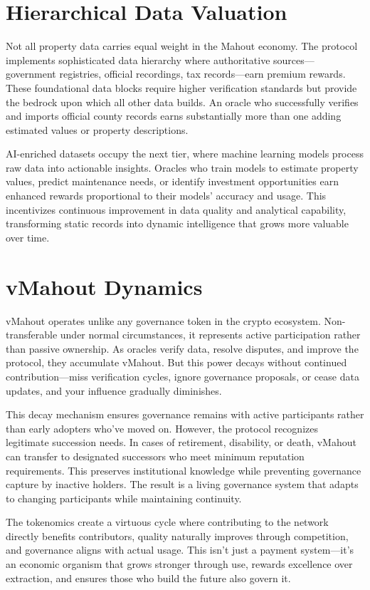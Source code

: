 \section{Hierarchical Data Valuation}

Not all property data carries equal weight in the Mahout economy. The protocol implements sophisticated data hierarchy where authoritative sources---government registries, official recordings, tax records---earn premium rewards. These foundational data blocks require higher verification standards but provide the bedrock upon which all other data builds. An oracle who successfully verifies and imports official county records earns substantially more than one adding estimated values or property descriptions.

AI-enriched datasets occupy the next tier, where machine learning models process raw data into actionable insights. Oracles who train models to estimate property values, predict maintenance needs, or identify investment opportunities earn enhanced rewards proportional to their models' accuracy and usage. This incentivizes continuous improvement in data quality and analytical capability, transforming static records into dynamic intelligence that grows more valuable over time.

\section{vMahout Dynamics}

vMahout operates unlike any governance token in the crypto ecosystem. Non-transferable under normal circumstances, it represents active participation rather than passive ownership. As oracles verify data, resolve disputes, and improve the protocol, they accumulate vMahout. But this power decays without continued contribution---miss verification cycles, ignore governance proposals, or cease data updates, and your influence gradually diminishes.

This decay mechanism ensures governance remains with active participants rather than early adopters who've moved on. However, the protocol recognizes legitimate succession needs. In cases of retirement, disability, or death, vMahout can transfer to designated successors who meet minimum reputation requirements. This preserves institutional knowledge while preventing governance capture by inactive holders. The result is a living governance system that adapts to changing participants while maintaining continuity.

The tokenomics create a virtuous cycle where contributing to the network directly benefits contributors, quality naturally improves through competition, and governance aligns with actual usage. This isn't just a payment system---it's an economic organism that grows stronger through use, rewards excellence over extraction, and ensures those who build the future also govern it.